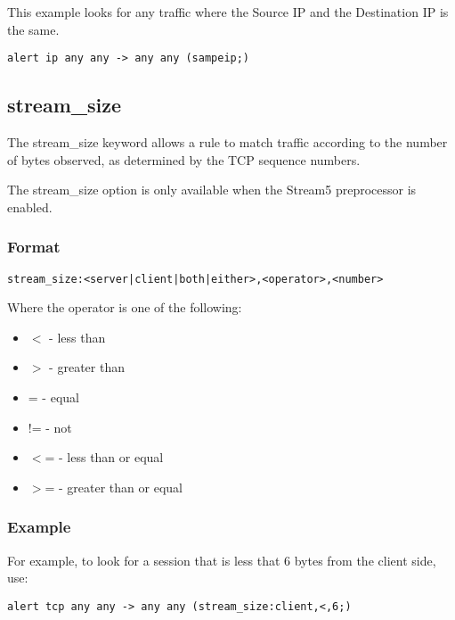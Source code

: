 \documentclass[english]{report}
\newenvironment{note}{
\samepage
    \vspace{10pt}{\textsf{
        {\hspace{7pt}\Huge{$\triangle$\hspace{-12.5pt}{\Large{$^!$}}}}\hspace{5pt}
        {\Large{NOTE}}
    }
    }
   \begin{center}
    \par\vspace{-17pt}

    \begin{lrbox}{\savepar}
    \begin{minipage}[r]{6in}
}
{
    \end{minipage}
    \end{lrbox}
    \fbox{
        \usebox{
            \savepar
	}
    }
    \par\vskip10pt
    \end{center}
}
\begin{document}
This example looks for any traffic where the Source IP and the Destination IP is the same.

\begin{verbatim}
alert ip any any -> any any (sampeip;)
\end{verbatim}

\subsection{stream\_size}

The stream\_size keyword allows a rule to match traffic according to the number
of bytes observed, as determined by the TCP sequence numbers.  

\begin{note}
The stream\_size option is only available when the Stream5 preprocessor is enabled.
\end{note}

\subsubsection{Format}

\begin{verbatim}
stream_size:<server|client|both|either>,<operator>,<number>
\end{verbatim}

Where the operator is one of the following:

\begin{itemize}
\item $<$ - less than
\item $>$ - greater than
\item = - equal
\item != - not
\item $<$= - less than or equal
\item $>$= - greater than or equal
\end{itemize}

\subsubsection{Example}

For example, to look for a session that is less that 6 bytes from the client side, use:

\begin{verbatim}
alert tcp any any -> any any (stream_size:client,<,6;)
\end{verbatim}
\end{document}
